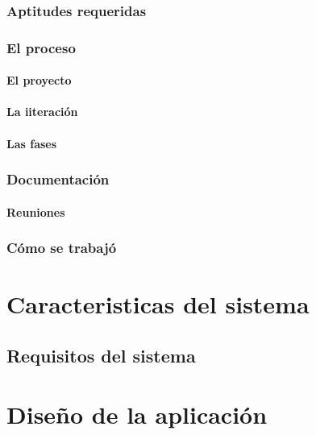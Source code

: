 \documentclass{iccmemoria}
\begin{document}
		\subsection{Aptitudes requeridas}
		\subsection{El proceso}
			\subsubsection{El proyecto}
			\subsubsection{La iiteración}
			\subsubsection{Las fases}
		\subsection{Documentación}
			\subsubsection{Reuniones}
		\subsection{Cómo se trabajó}
	
\chapter{Caracteristicas del sistema}
	\section{Requisitos del sistema}
	

\chapter{Diseño de la aplicación}





	
\end{document}
